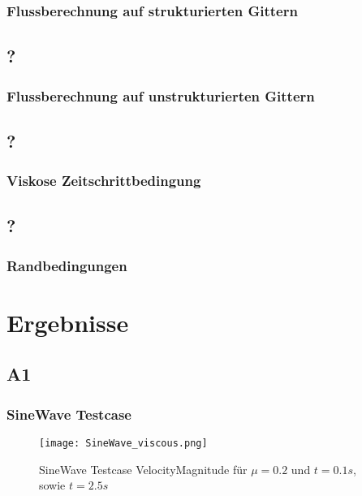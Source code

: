\documentclass[
	11pt, %
	aspectratio=169, %
]{beamer}
\begin{document}
\begin{frame}
	\frametitle{Flussberechnung auf strukturierten Gittern}

\end{frame}


\subsection{?}

\begin{frame}
	\frametitle{Flussberechnung auf unstrukturierten Gittern}
	

\end{frame}	

\subsection{?}
\begin{frame}
	\frametitle{Viskose Zeitschrittbedingung}

\end{frame}

\subsection{?}
\begin{frame}
	\frametitle{Randbedingungen}

\end{frame}



\section{Ergebnisse}

\subsection{A1}
\begin{frame}
	\frametitle{SineWave Testcase}
	\begin{figure}
		\texttt{[image: SineWave\_viscous.png]}
		\caption{SineWave Testcase VelocityMagnitude für $\mu=0.2$ und $t=0.1s$, sowie $t=2.5s$}
	\end{figure}
	


\end{frame}
\end{document}
